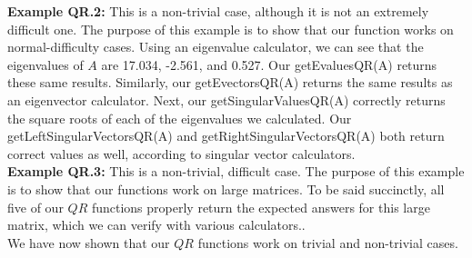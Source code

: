 \documentclass{article}
\begin{document}
\noindent \textbf{Example QR.2: }This is a non-trivial case, although it is not an extremely difficult one. The purpose of this example is to show that our function works on normal-difficulty cases. Using an eigenvalue calculator, we can see that the eigenvalues of $A$ are 17.034, -2.561, and 0.527. Our getEvaluesQR(A) returns these same results. Similarly, our getEvectorsQR(A) returns the same results as an eigenvector calculator. Next, our getSingularValuesQR(A) correctly returns the square roots of each of the eigenvalues we calculated. Our getLeftSingularVectorsQR(A) and getRightSingularVectorsQR(A) both return correct values as well, according to singular vector calculators. \\

\noindent \textbf{Example QR.3: }This is a non-trivial, difficult case. The purpose of this example is to show that our functions work on large matrices. To be said succinctly, all five of our $QR$ functions properly return the expected answers for this large matrix, which we can verify with various calculators.. \\

\noindent We have now shown that our $QR$ functions work on trivial and non-trivial cases.
\end{document}
